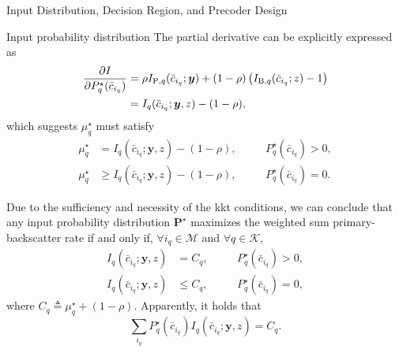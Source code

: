 \documentclass[journal]{IEEEtran}
\begin{document}
\begin{section}{Input Distribution, Decision Region, and Precoder Design}
\begin{subsection}{Input probability distribution}
			The partial derivative can be explicitly expressed as
			\begin{subequations}
				\begin{align}
					\pdv{I}{P_q^{\star}(\bar{c}_{i_q})}
					& = \rho I_{\mathrm{P},q}(\bar{c}_{i_q};\boldsymbol{y}) + (1 - \rho) \left( I_{\mathrm{B},q}(\bar{c}_{i_q};z) - 1 \right)\\
					& = I_q(\bar{c}_{i_q};\boldsymbol{y},z) - (1 - \rho),
				\end{align}
			\end{subequations}
			which suggests $\mu_q^{\star}$ must satisfy
			\begin{subequations}
				\begin{alignat}{2}
					\mu_q^{\star} & = I_q(\bar{c}_{i_q};\boldsymbol{y},z) - (1 - \rho), \quad && P_q^{\star}(\bar{c}_{i_q}) > 0,\\
					\mu_q^{\star} & \ge I_q(\bar{c}_{i_q};\boldsymbol{y},z) - (1 - \rho), \quad && P_q^{\star}(\bar{c}_{i_q}) = 0.
				\end{alignat}
			\end{subequations}

			Due to the sufficiency and necessity of the \gls{kkt} conditions, we can conclude that any input probability distribution $\boldsymbol{P}^{\star}$ maximizes the weighted sum primary-backscatter rate if and only if, $\forall i_q \in \mathcal{M}$ and $\forall q \in \mathcal{K}$,
			\begin{subequations}
				\begin{alignat}{2}
					I_q(\bar{c}_{i_q};\boldsymbol{y},z) & = C_q, \quad && P_q^{\star}(\bar{c}_{i_q}) > 0,\\
					I_q(\bar{c}_{i_q};\boldsymbol{y},z) & \le C_q, \quad && P_q^{\star}(\bar{c}_{i_q}) = 0,
				\end{alignat}
			\end{subequations}
			where $C_q \triangleq \mu_q^{\star} + (1 - \rho)$. Apparently, it holds that
			\begin{equation}
				\sum_{i_q} P_q^{\star}(\bar{c}_{i_q}) I_q(\bar{c}_{i_q};\boldsymbol{y},z) = C_q.
			\end{equation}


\end{subsection}
\end{section}
\end{document}
